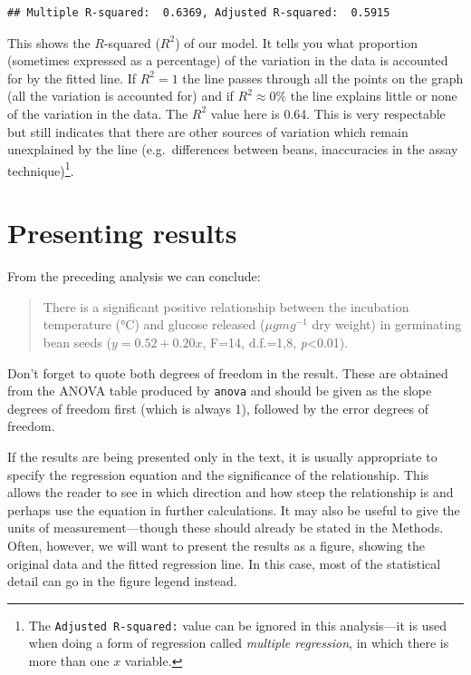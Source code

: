 \documentclass[
]{book}
\begin{document}
\begin{verbatim}
## Multiple R-squared:  0.6369, Adjusted R-squared:  0.5915
\end{verbatim}

This shows the \(R\)-squared (\(R^{2}\)) of our model. It tells you what proportion (sometimes expressed as a percentage) of the variation in the data is accounted for by the fitted line. If \(R^{2}=1\) the line passes through all the points on the graph (all the variation is accounted for) and if \(R^{2}\approx 0\%\) the line explains little or none of the variation in the data. The \(R^{2}\) value here is 0.64. This is very respectable but still indicates that there are other sources of variation which remain unexplained by the line (e.g.~differences between beans, inaccuracies in the assay technique)\footnote{The \texttt{Adjusted\ R-squared:} value can be ignored in this analysis---it is used when doing a form of regression called \emph{multiple regression}, in which there is more than one \(x\) variable.}.

\hypertarget{present-results}{%
\section{Presenting results}\label{present-results}}

From the preceding analysis we can conclude:

\begin{quote}
There is a significant positive relationship between the incubation temperature (°C) and glucose released (\(\mu g mg^{-1}\) dry weight) in germinating bean seeds (\(y=0.52+0.20x\), F=14, d.f.=1,8, \emph{p}\textless0.01).
\end{quote}

Don't forget to quote both degrees of freedom in the result. These are obtained from the ANOVA table produced by \texttt{anova} and should be given as the slope degrees of freedom first (which is always 1), followed by the error degrees of freedom.

If the results are being presented only in the text, it is usually appropriate to specify the regression equation and the significance of the relationship. This allows the reader to see in which direction and how steep the relationship is and perhaps use the equation in further calculations. It may also be useful to give the units of measurement---though these should already be stated in the Methods. Often, however, we will want to present the results as a figure, showing the original data and the fitted regression line. In this case, most of the statistical detail can go in the figure legend instead.
\end{document}
